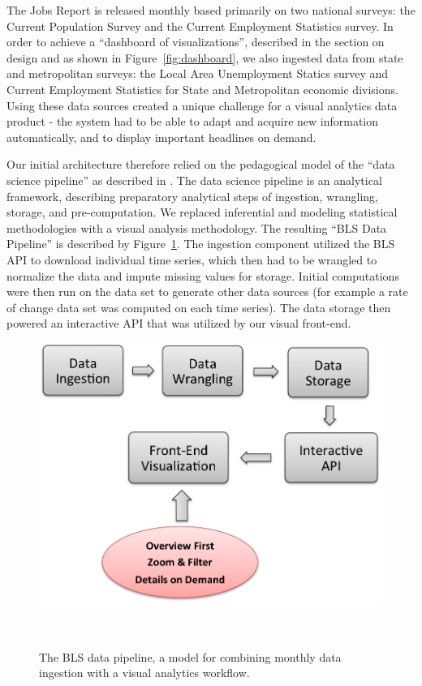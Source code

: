 \documentclass{sigchi}
\newcommand\Ben[1]{{\color{blue}#1}}	%
\begin{document}
\Ben{The Jobs Report is released monthly based primarily on two national surveys: the Current Population Survey and the Current Employment Statistics survey. In order to achieve a ``dashboard of visualizations'', described in the section on design and as shown in Figure~\ref{fig:dashboard}, we also ingested data from state and metropolitan surveys: the Local Area Unemployment Statics survey and Current Employment Statistics for State and Metropolitan economic divisions. Using these data sources created a unique challenge for a visual analytics data product - the system had to be able to adapt and acquire new information automatically, and to display important headlines on demand.

Our initial architecture therefore relied on the pedagogical model of the ``data science pipeline'' as described in \cite{ojeda_practical_2014}. The data science pipeline is an analytical framework, describing preparatory analytical steps of ingestion, wrangling, storage, and pre-computation. We replaced inferential and modeling statistical methodologies with a visual analysis methodology. The resulting ``BLS Data Pipeline'' is described by Figure~\ref{fig:pipline}. The ingestion component utilized the BLS API to download individual time series, which then had to be wrangled to normalize the data and impute missing values for storage. Initial computations were then run on the data set to generate other data sources (for example a rate of change data set was computed on each time series). The data storage then powered an interactive API that was utilized by our visual front-end.

\begin{figure}[!h]
    \centering
    \includegraphics[width=0.9\columnwidth]{figures/pipeline.png}
    \caption{The BLS data pipeline, a model for combining monthly data ingestion with a visual analytics workflow.}~\label{fig:pipline}
\end{figure}

}
\end{document}

